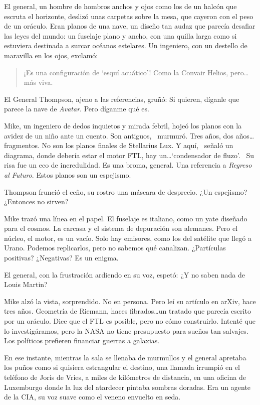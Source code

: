 El general, un hombre de hombros anchos y ojos como los de un halcón que escruta el horizonte, deslizó unas carpetas sobre la mesa, que cayeron con el peso de un oráculo. Eran planos de una nave, un diseño tan audaz que parecía desafiar las leyes del mundo: un fuselaje plano y ancho, con una quilla larga como si estuviera destinada a surcar océanos estelares. Un ingeniero, con un destello de maravilla en los ojos, exclamó:

\begin{quote}
\calli
\glqq ¡Es una configuración de `esquí acuático'! Como la Convair Helios, pero\ldots más viva.\grqq
\end{quote}

El General Thompson, ajeno a las referencias, gruñó: \glqq Si quieren, díganle que parece la nave de \emph{Avatar}. Pero díganme qué es.\grqq

Mike, un ingeniero de dedos inquietos y mirada febril, hojeó los planos con la avidez de un niño ante un cuento. \glqq Son antiguos,\grqq~ murmuró. \glqq Tres años, dos años\ldots fragmentos. No son los planos finales de Stellarius Lux. Y aquí,\grqq~ señaló un diagrama, \glqq donde debería estar el motor FTL, hay un\ldots `condensador de fluzo'.\grqq~ Su risa fue un eco de incredulidad. \glqq Es una broma, general. Una referencia a \emph{Regreso al Futuro}. Estos planos son un espejismo.\grqq

Thompson frunció el ceño, su rostro una máscara de desprecio. \glqq ¿Un espejismo? ¿Entonces no sirven?\grqq

Mike trazó una línea en el papel. \glqq El fuselaje es italiano, como un yate diseñado para el cosmos. La carcasa y el sistema de depuración son alemanes. Pero el núcleo, el motor, es un vacío. Solo hay emisores, como los del satélite que llegó a Urano. Podemos replicarlos, pero no sabemos qué canalizan. ¿Partículas positivas? ¿Negativas? Es un enigma.\grqq

El general, con la frustración ardiendo en su voz, espetó: \glqq ¿Y no saben nada de Louis Martin?\grqq

Mike alzó la vista, sorprendido. \glqq No en persona. Pero leí su artículo en arXiv, hace tres años. Geometría de Riemann, haces fibrados\ldots un tratado que parecía escrito por un oráculo. Dice que el FTL es posible, pero no cómo construirlo. Intenté que lo investigáramos, pero la NASA no tiene presupuesto para sueños tan salvajes. Los políticos prefieren financiar guerras a galaxias.\grqq

En ese instante, mientras la sala se llenaba de murmullos y el general apretaba los puños como si quisiera estrangular el destino, una llamada irrumpió en el teléfono de Joris de Vries, a miles de kilómetros de distancia, en una oficina de Luxemburgo donde la luz del atardecer pintaba sombras doradas. Era un agente de la CIA, su voz suave como el veneno envuelto en seda.

